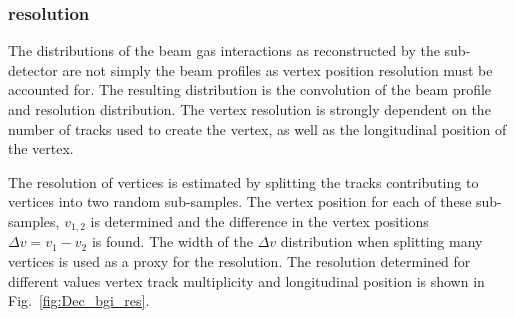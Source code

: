 \subsubsection{\velo resolution}

The distributions of the beam gas interactions as reconstructed by the \velo sub-detector are not simply the beam profiles as vertex position resolution must be accounted for. The resulting distribution is the convolution of the beam profile and resolution distribution. The \velo vertex resolution is strongly dependent on the number of tracks used to create the vertex, as well as the longitudinal position of the vertex. 

The resolution of vertices is estimated by splitting the tracks contributing to vertices into two random sub-samples. The vertex position for each of these sub-samples, $v_{1,2}$ is determined and the difference in the vertex positions $\Delta v = v_{1}-v_{2}$ is found. The width of the $\Delta v$ distribution when splitting many vertices is used as a proxy for the resolution. 
The resolution determined for different values vertex track multiplicity and longitudinal position is shown in Fig.~\ref{fig:Dec_bgi_res}.
